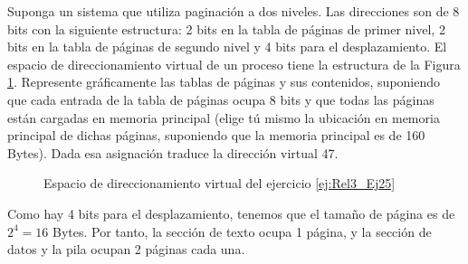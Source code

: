\begin{ejercicio} \label{ej:Rel3_Ej25}
    Suponga un sistema que utiliza paginación a dos niveles. Las direcciones son de 8 bits
con la siguiente estructura: 2 bits en la tabla de páginas de primer nivel, 2 bits en la tabla
de páginas de segundo nivel y 4 bits para el desplazamiento. El espacio de
direccionamiento virtual de un proceso tiene la estructura de la Figura \ref{fig:Rel3_Ej25}. Represente
gráficamente las tablas de páginas y sus contenidos, suponiendo que cada entrada de la
tabla de páginas ocupa 8 bits y que todas las páginas están cargadas en memoria
principal (elige tú mismo la ubicación en memoria principal de dichas páginas,
suponiendo que la memoria principal es de 160 Bytes). Dada esa asignación traduce la
dirección virtual 47.
\begin{figure}[H]
    \centering
    \caption{Espacio de direccionamiento virtual del ejercicio \ref{ej:Rel3_Ej25}}
    \label{fig:Rel3_Ej25}
\end{figure}

Como hay 4 bits para el desplazamiento, tenemos que el tamaño de página es de
$2^4=16$ Bytes. Por tanto, la sección de texto ocupa 1 página,
y la sección de datos y la pila ocupan 2 páginas cada una.\\
\end{ejercicio}


